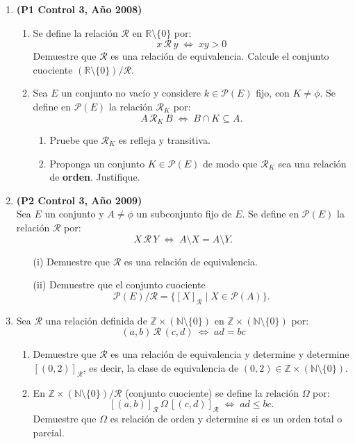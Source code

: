 \documentclass[10pt]{article}
\newcommand{\R}{\mathbb R}
\newcommand{\N}{\mathbb N}
\newcommand{\Z}{\mathbb Z}
\newcommand{\pr}[1]{\cur{P}(#1)}
\theoremstyle{plain}
\newcommand{\cur}[1]{\mathcal{#1}}
\theoremstyle{definition}
\begin{document}
\begin{enumerate}[label=\textbf{P\arabic*.-}]
\item \textbf{(P1 Control 3, Año 2008)}
\begin{enumerate}
\item Se define la relación $\cur{R}$ en $\R\setminus \{0\}$ por:
$$x\,\cur{R}\,y \; \Longleftrightarrow \; xy>0$$
Demuestre que $\cur{R}$ es una relación de equivalencia. Calcule el conjunto cuociente $(\R\setminus\{0\})/ \cur{R}$.
\item Sea $E$ un conjunto no vacío y considere $k\in\pr{E}$ fijo, con $K\neq \phi$. Se define en $\pr{E}$ la relación $\cur{R}_{K}$ por:
$$A\,\cur{R}_{K} \, B \; \Longleftrightarrow \; B\cap K \subseteq A.$$
\begin{enumerate}
\item Pruebe que $\cur{R}_{K}$ es refleja y transitiva.
\item Proponga un conjunto $K\in \pr{E}$ de modo que $\cur{R}_{K}$ sea una relación de \textbf{orden}. Justifique.
\end{enumerate}
\end{enumerate}

\item \textbf{(P2 Control 3, Año 2009)}\\
Sea $E$ un conjunto y $A\neq\phi$ un subconjunto fijo de $E$. Se define en $\pr{E}$ la relación $\cur{R}$ por:
$$X\,\cur{R}\,Y \; \Longleftrightarrow \; A\setminus X=A \setminus Y.$$
\begin{enumerate}
\item[(i)] Demuestre que $\cur{R}$ es una relación de equivalencia.
\item[(ii)] Demuestre que el conjunto cuociente
$$\pr{E}/\cur{R}=\{[X]_{\cur{R}}\;|\;X\in\pr{A}\}.$$
\end{enumerate}





\item %
Sea $\cur{R}$ una relación definida de $\Z\times(\N\setminus\{0\})$ en $\Z\times(\N\setminus\{0\})$ por:
$$(a,b)\,\cur{R}\,(c,d) \; \Longleftrightarrow \; ad=bc$$
\begin{enumerate}
\item Demuestre que $\cur{R}$ es una relación de equivalencia y determine y determine $[(0,2)]_{\cur{R}}$, es decir, la clase de equivalencia de $(0,2)\in \Z\times(\N\setminus\{0\})$.
\item En $\Z\times(\N\setminus\{0\})/\cur{R}$ (conjunto cuociente) se define la relación $\Omega$ por: $$[(a,b)]_{\cur{R}}\,\Omega\,[(c,d)]_{\cur{R}}\;\Longleftrightarrow \; ad\leq bc.$$ Demuestre que $\Omega$ es relación de orden y determine si es un orden total o parcial.
\end{enumerate}


\end{enumerate}
\end{document}

